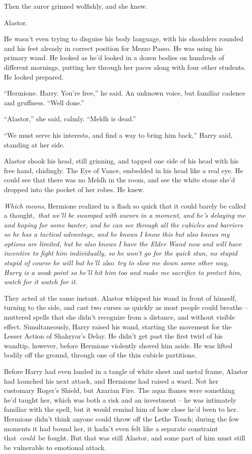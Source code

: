 Then the auror grinned wolfishly, and she knew.

Alastor.

He wasn't even trying to disguise his body language, with his shoulders
rounded and his feet already in correct position for Mezzo Passo. He was
using his primary wand. He looked as he'd looked in a dozen bodies on
hundreds of different mornings, putting her through her paces along with
four other students. He looked prepared.

``Hermione. Harry. You're free,'' he said. An unknown voice, but
familiar cadence and gruffness. ``Well done.''

``Alastor,'' she said, calmly. ``Meldh is dead.''

``We must serve his interests, and find a way to bring him back,'' Harry
said, standing at her side.

Alastor shook his head, still grinning, and tapped one side of his head
with his free hand, chidingly. The Eye of Vance, embedded in his head
like a real eye. He could see that there was no Meldh in the room, and
see the white stone she'd dropped into the pocket of her robes. He knew.

\emph{Which means}, Hermione realized in a flash so quick that it could
barely be called a thought,~\emph{that we'll be swamped with aurors in a
moment, and he's delaying me and hoping for some banter, and he can see
through all the cubicles and barriers so he has a tactical advantage,
and he knows I know this but also knows my options are limited, but he
also knows I have the Elder Wand now and will have incentive to fight
him individually, so he won't go for the quick stun, no stupid stupid of
course he will but he'll}~also~\emph{try to slow me down some other way,
Harry is a weak point so he'll hit him too and make me sacrifice to
protect him, watch for it watch for it.}

They acted at the same instant. Alastor whipped his wand in front of
himself, turning to the side, and cast two curses as quickly as most
people could breathe -- muttered spells that she didn't recognize from a
distance, and without visible effect. Simultaneously, Harry raised his
wand, starting the movement for the Lesser Action of Shahryar's Delay.
He didn't get past the first twirl of his wandtip, however, before
Hermione violently shoved him aside. He was lifted bodily off the
ground, through one of the thin cubicle partitions.

Before Harry had even landed in a tangle of white sheet and metal frame,
Alastor had launched his next attack, and Hermione had raised a ward.
Not her customary Roger's Shield, but Azarian Fire. The aqua flames were
something he'd taught her, which was both a risk and an investment -- he
was intimately familiar with the spell, but it would remind him of how
close he'd been to her. Hermione didn't think anyone could throw off the
Lethe Touch; during the few moments it had bound her, it hadn't even
felt like a separate constraint that~\emph{could}~be fought. But that
was still Alastor, and some part of him must still be vulnerable to
emotional attack.

